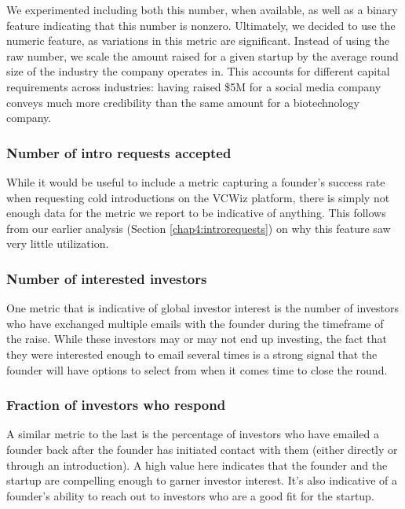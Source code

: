 We experimented including both this number, when available, as well as a binary feature indicating that this number is nonzero. Ultimately, we decided to use the numeric feature, as variations in this metric are significant. Instead of using the raw number, we scale the amount raised for a given startup by the average round size of the industry the company operates in. This accounts for different capital requirements across industries: having raised \$5M for a social media company conveys much more credibility than the same amount for a biotechnology company.

\subsubsection{Number of intro requests accepted}

While it would be useful to include a metric capturing a founder's success rate when requesting cold introductions on the VCWiz platform, there is simply not enough data for the metric we report to be indicative of anything. This follows from our earlier analysis (Section \ref{chap4:introrequests}) on why this feature saw very little utilization.

\subsubsection{Number of interested investors}

One metric that is indicative of global investor interest is the number of investors who have exchanged multiple emails with the founder during the timeframe of the raise. While these investors may or may not end up investing, the fact that they were interested enough to email several times is a strong signal that the founder will have options to select from when it comes time to close the round.

\subsubsection{Fraction of investors who respond}

A similar metric to the last is the percentage of investors who have emailed a founder back after the founder has initiated contact with them (either directly or through an introduction). A high value here indicates that the founder and the startup are compelling enough to garner investor interest. It's also indicative of a founder's ability to reach out to investors who are a good fit for the startup.

